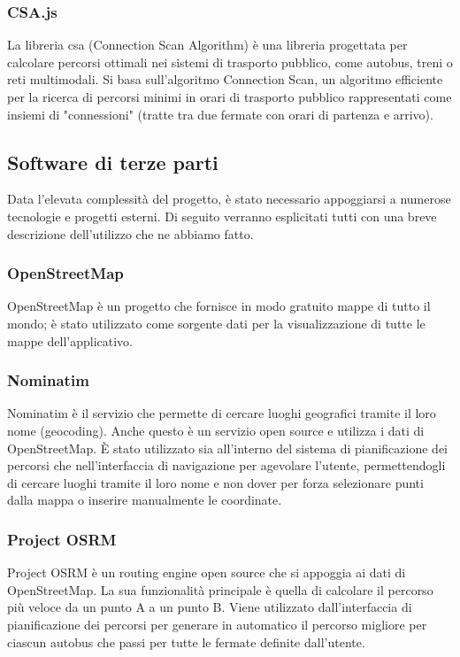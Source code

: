 \subsubsection{CSA.js}
La libreria csa (Connection Scan Algorithm) è una libreria progettata per calcolare percorsi ottimali nei sistemi di trasporto pubblico, come autobus, treni o reti multimodali. Si basa sull’algoritmo Connection Scan, un algoritmo efficiente per la ricerca di percorsi minimi in orari di trasporto pubblico rappresentati come insiemi di "connessioni" (tratte tra due fermate con orari di partenza e arrivo).
\subsection{Software di terze parti}

Data l'elevata complessità del progetto, è stato necessario appoggiarsi a numerose tecnologie e progetti esterni. Di seguito verranno esplicitati tutti con una breve descrizione dell'utilizzo che ne abbiamo fatto.

\subsubsection{OpenStreetMap}

OpenStreetMap è un progetto che fornisce in modo gratuito mappe di tutto il mondo; è stato utilizzato come sorgente dati per la visualizzazione di tutte le mappe dell'applicativo.

\subsubsection{Nominatim}

Nominatim è il servizio che permette di cercare luoghi geografici tramite il loro nome (geocoding). Anche questo è un servizio open source e utilizza i dati di OpenStreetMap.
È stato utilizzato sia all'interno del sistema di pianificazione dei percorsi che nell'interfaccia di navigazione per agevolare l'utente, permettendogli di cercare luoghi tramite il loro nome e non dover per forza selezionare punti dalla mappa o inserire manualmente le coordinate.

\subsubsection{Project OSRM}
Project OSRM è un routing engine open source che si appoggia ai dati di OpenStreetMap. La sua funzionalità principale è quella di calcolare il percorso più veloce da un punto A a un punto B.
Viene utilizzato dall'interfaccia di pianificazione dei percorsi per generare in automatico il percorso migliore per ciascun autobus che passi per tutte le fermate definite dall'utente.


